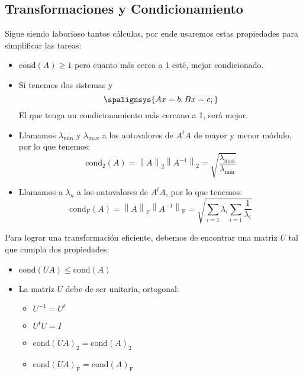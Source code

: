 \subsection{Transformaciones y Condicionamiento}
Sigue siendo laborioso tantos cálculos, por ende usaremos estas propiedades para simplificar las tareas:
\begin{itemize}
        \item \(\text{cond}(A) \geq 1\) pero cuanto más cerca a 1 esté, mejor condicionado.
        \item Si tenemos dos sistemas y \[
                      \spalignsys{
                              Ax = b ;
                              Bx = c;
                      }
              \] El que tenga un condicionamiento más cercano a 1, será mejor.
        \item Llamamos \(\lambda_{\text{min}}\) y \(\lambda_{\max }\) a los autovalores de \(A^tA\) de mayor y menor módulo, por lo que tenemos:
              \[
                      \boxed{\text{cond}_2(A) = \left \| A \right \|_2 \left \| A^{-1} \right \|_2=\sqrt{\frac{\lambda_{\max }}{\lambda_{\text{min}}}}}
              \]
        \item Llamamos a \(\lambda_n\) a los autovalores de \(A^tA\), por lo que tenemos:
              \[
                      \boxed{\text{cond}_\text{F}(A) = \left \| A \right \|_\text{F} \left \| A^{-1} \right \|_\text{F}=\sqrt{\sum_{i=1}\lambda_i \sum_{i=1}\frac{1}{\lambda_i}}}
              \]
\end{itemize}
Para lograr una transformación eficiente, debemos de encontrar una matriz \(U\) tal que cumpla dos propiedades:
\begin{itemize}
        \item \(\text{cond}(UA)\leq \text{cond}(A)\)
        \item La matriz \(U\) debe de ser unitaria, ortogonal:
              \begin{itemize}
                      \item \(U^{-1} = U^t\)
                      \item \(U^tU = I\)
                      \item \(\text{cond}(UA)_2 = \text{cond}(A)_2\)
                      \item \(\text{cond}(UA)_\text{F} = \text{cond}(A)_\text{F}\)
              \end{itemize}
\end{itemize}
